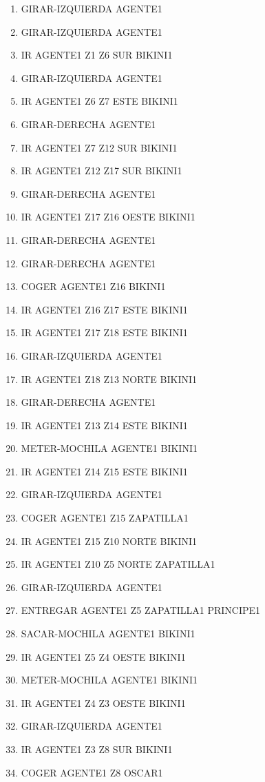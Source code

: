 \documentclass[12pt,a4paper]{article}
\begin{document}
\begin{enumerate}
	\item GIRAR-IZQUIERDA AGENTE1
	\item GIRAR-IZQUIERDA AGENTE1
	\item IR AGENTE1 Z1 Z6 SUR BIKINI1
	\item GIRAR-IZQUIERDA AGENTE1
	\item IR AGENTE1 Z6 Z7 ESTE BIKINI1
	\item GIRAR-DERECHA AGENTE1
	\item IR AGENTE1 Z7 Z12 SUR BIKINI1
	\item IR AGENTE1 Z12 Z17 SUR BIKINI1
	\item GIRAR-DERECHA AGENTE1
	\item IR AGENTE1 Z17 Z16 OESTE BIKINI1
	\item GIRAR-DERECHA AGENTE1
	\item GIRAR-DERECHA AGENTE1
	\item COGER AGENTE1 Z16 BIKINI1
	\item IR AGENTE1 Z16 Z17 ESTE BIKINI1
	\item IR AGENTE1 Z17 Z18 ESTE BIKINI1
	\item GIRAR-IZQUIERDA AGENTE1
	\item IR AGENTE1 Z18 Z13 NORTE BIKINI1
	\item GIRAR-DERECHA AGENTE1
	\item IR AGENTE1 Z13 Z14 ESTE BIKINI1
	\item METER-MOCHILA AGENTE1 BIKINI1
	\item IR AGENTE1 Z14 Z15 ESTE BIKINI1
	\item GIRAR-IZQUIERDA AGENTE1
	\item COGER AGENTE1 Z15 ZAPATILLA1
	\item IR AGENTE1 Z15 Z10 NORTE BIKINI1
	\item IR AGENTE1 Z10 Z5 NORTE ZAPATILLA1
	\item GIRAR-IZQUIERDA AGENTE1
	\item ENTREGAR AGENTE1 Z5 ZAPATILLA1 PRINCIPE1
	\item SACAR-MOCHILA AGENTE1 BIKINI1
	\item IR AGENTE1 Z5 Z4 OESTE BIKINI1
	\item METER-MOCHILA AGENTE1 BIKINI1
	\item IR AGENTE1 Z4 Z3 OESTE BIKINI1
	\item GIRAR-IZQUIERDA AGENTE1
	\item IR AGENTE1 Z3 Z8 SUR BIKINI1
	\item COGER AGENTE1 Z8 OSCAR1

\end{enumerate}
\end{document}
